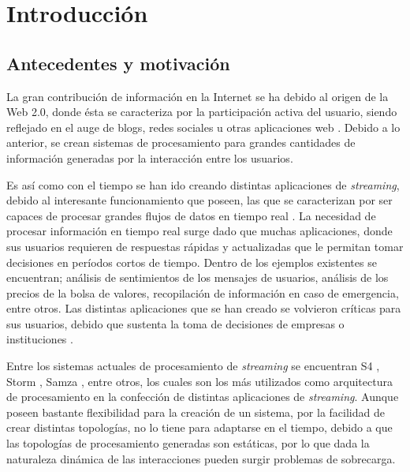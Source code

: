 \chapter{Introducción}
\label{cap:introduccion}

\section{Antecedentes y motivación}
\label{intro:motivacion}

La gran contribución de información en la Internet se ha debido al origen de la Web 2.0, donde ésta se caracteriza por la participación activa del usuario, siendo reflejado en el auge de blogs, redes sociales u otras aplicaciones web \citep{web2007oberhelman}. Debido a lo anterior, se crean sistemas de procesamiento para grandes cantidades de información generadas por la interacción entre los usuarios.

Es así como con el tiempo se han ido creando distintas aplicaciones de \textsl{streaming}, debido al interesante funcionamiento que poseen, las que se caracterizan por ser capaces de procesar grandes flujos de datos en tiempo real \citep{ChenZ14a}. La necesidad de procesar informaci\'on en tiempo real surge dado que muchas aplicaciones, donde sus usuarios requieren de respuestas r\'apidas y actualizadas que le permitan tomar decisiones en per\'iodos cortos de tiempo. Dentro de los ejemplos existentes se encuentran; análisis de sentimientos de los mensajes de usuarios, análisis de los precios de la bolsa de valores, recopilación de información en caso de emergencia, entre otros. Las distintas aplicaciones que se han creado se volvieron críticas para sus usuarios, debido que sustenta la toma de decisiones de empresas o instituciones \citep{Wenzel14}.

Entre los sistemas actuales de procesamiento de \textsl{streaming} se encuentran S4 \citep{s4yahoo}, Storm \citep{stormtwitter}, Samza \citep{samza}, entre otros, los cuales son los más utilizados como arquitectura de procesamiento en la confección de distintas aplicaciones de \textsl{streaming}. Aunque poseen bastante flexibilidad para la creación de un sistema, por la facilidad de crear distintas topologías, no lo tiene para adaptarse en el tiempo, debido a que las topolog\'ias de procesamiento generadas son est\'aticas, por lo que dada la naturaleza din\'amica de las interacciones pueden surgir problemas de sobrecarga.

